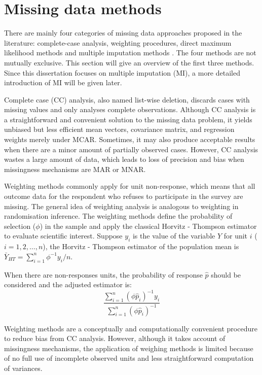 \section{Missing data methods}
There are mainly four categories of missing data approaches proposed in the literature: complete-case analysis, weighting procedures, direct maximum likelihood methods and multiple imputation methods \citep{little2019statistical}. The four methods are not mutually exclusive. This section will give an overview of the first three methods. Since this dissertation focuses on multiple imputation (MI), a more detailed introduction of MI will be given later. 

Complete case (CC) analysis, also named list-wise deletion, discards cases with missing values and only analyses complete observations. Although CC analysis is a straightforward and convenient solution to the missing data problem, it yields unbiased but less efficient mean vectors, covariance matrix, and regression weights merely under MCAR. Sometimes, it may also produce acceptable results when there are a minor amount of partially observed cases. However, CC analysis wastes a large amount of data, which leads to loss of precision and bias when missingness mechanisms are MAR or MNAR. 

Weighting methods commonly apply for unit non-response, which means that all outcome data for the respondent who refuses to participate in the survey are missing. The general idea of weighting analysis is analogous to weighting in randomisation inference. The weighting methods define the probability of selection ($\phi$) in the sample and apply the classical Horvitz - Thompson estimator \citep{horvitz1952generalization} to evaluate scientific interest. Suppose $y_i$ is the value of the variable $Y$ for unit $i$ ($i = 1, 2, \dots, n$), the Horvitz - Thompson estimator of the population mean is $\bar{Y}_{HT} = \sum_{i=1}^{n}\phi^{-1}y_i/n$. 

When there are non-responses units, the probability of response $\hat{p}$ should be considered and the adjusted estimator is:
\begin{equation*}
	\frac{\sum_{i=1}^{n}(\phi\hat{p}_i)^{-1}y_i}{\sum_{i=1}^{n}(\phi\hat{p}_i)^{-1}}
\end{equation*}

Weighting methods are a conceptually and computationally convenient procedure to reduce bias from CC analysis. However, although it takes account of missingness mechanisms, the application of weighing methods is limited because of no full use of incomplete observed units and less straightforward computation of variances. 

